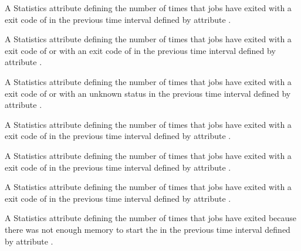 \begin{description}
\item[\AdAttr{RecentJobsExitedAndClaimClosing}:] A Statistics attribute defining
  the number of times that jobs 
  have exited with a  exit code of 
  in the previous time interval defined by attribute .

\item[\AdAttr{RecentJobsExitedNormally}:] A Statistics attribute defining
  the number of times that jobs have exited 
  with a  exit code of  or with an
  exit code of 
  in the previous time interval defined by attribute .

\item[\AdAttr{RecentJobsExitException}:] A Statistics attribute defining
  the number of times that jobs 
  have exited with a  exit code of 
  or with an unknown status
  in the previous time interval defined by attribute .

\item[\AdAttr{RecentJobsKilled}:] A Statistics attribute defining
  the number of times that jobs 
  have exited with a  exit code of 
  in the previous time interval defined by attribute .

\item[\AdAttr{RecentJobsMissedDeferralTime}:] A Statistics attribute defining
  the number of times that jobs 
  have exited with a  exit code of 
  in the previous time interval defined by attribute .

\item[\AdAttr{RecentJobsNotStarted}:] A Statistics attribute defining
  the number of times that jobs 
  have exited with a  exit code of 
  in the previous time interval defined by attribute .

\item[\AdAttr{RecentJobsShadowNoMemory}:] A Statistics attribute defining
  the number of times that jobs have exited 
  because there was not enough memory to start the 
  in the previous time interval defined by attribute .


\end{description}
